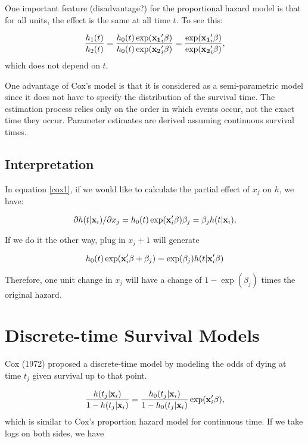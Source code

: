 One important feature (disadvantage?) for the proportional hazard
model is that for all units, the effect is the same at all time $t$.
To see this:

\begin{equation}
\frac{h_1(t)}{h_2(t)} = \frac{h_0(t)\exp ({\bf x_1}'_i \beta)}{h_0(t)\exp ({\bf x_2}'_i \beta)}= \frac{\exp ({\bf x_1}'_i \beta)}{\exp ({\bf x_2}'_i \beta)},
\end{equation}
which does not depend on $t$.  

One advantage of Cox's model is that it is considered as a
semi-parametric model since it does not have to specify the
distribution of the survival time.  The estimation process relies only
on the order in which events occur, not the exact time they occur.
Parameter estimates are derived assuming continuous survival times.

\subsection{Interpretation}

In equation \ref{cox1}, if we would like to calculate the partial effect of $x_j$ on $h$, we have:

\begin{equation}
\partial h(t | {\bf x}_i) / \partial x_j=h_0(t)\exp ({\bf x}'_i \beta) \beta_j = \beta_j h(t | {\bf x}_i),
\end{equation}

If we do it the other way, plug in $x_j + 1$ will generate

\begin{equation}
h_0(t)\exp ({\bf x}'_i \beta + \beta_j) = \exp (\beta_j) h(t|{\bf x}'_i \beta)
\label{cox2}
\end{equation}


Therefore, one unit change in $x_j$ will have a change of $1- \exp(\beta_j)$ times the original hazard.

\section{Discrete-time Survival Models}

Cox (1972)  proposed a discrete-time model by modeling the odds of dying at time $t_j$ given survival up to that point.

\begin{equation}
\frac{h(t_j | {\bf x}_i)}{1- h(t_j | {\bf x}_i)} = \frac{h_0(t_j | {\bf x}_i)}{1- h_0(t_j | {\bf x}_i)} \exp({\bf x}'_i \beta),
\end{equation}
which is similar to Cox's proportion hazard model for continuous time.  If we take logs on both sides, we have 

